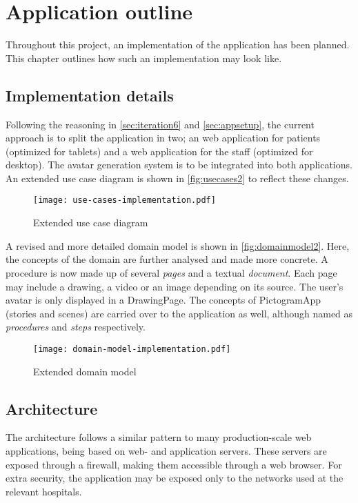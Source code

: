 \chapter{Application outline}
\label{ch:outline}

Throughout this project, an implementation of the application has been planned. This chapter outlines how such an implementation may look like.

\section{Implementation details}

Following the reasoning in \autoref{sec:iteration6} and \autoref{sec:appsetup}, the current approach is to split the application in two; an web application for patients (optimized for tablets) and a web application for the staff (optimized for desktop). The avatar generation system is to be integrated into both applications. An extended use case diagram is shown in \autoref{fig:usecases2} to reflect these changes.

\begin{figure}
    \centering
    \texttt{[image: use-cases-implementation.pdf]}
    \caption{Extended use case diagram}
    \label{fig:usecases2}
\end{figure}

A revised and more detailed domain model is shown in \autoref{fig:domainmodel2}. Here, the concepts of the domain are further analysed and made more concrete. A procedure is now made up of several \emph{pages} and a textual \emph{document}. Each page may include a drawing, a video or an image depending on its source. The user's avatar is only displayed in a DrawingPage. The concepts of PictogramApp (stories and scenes) are carried over to the application as well, although named as \emph{procedures} and \emph{steps} respectively.

\begin{figure}
    \centering
    \texttt{[image: domain-model-implementation.pdf]}
    \caption{Extended domain model}
    \label{fig:domainmodel2}
\end{figure}

\section{Architecture}

The architecture follows a similar pattern to many production-scale web applications, being based on web- and application servers. These servers are exposed through a firewall, making them accessible through a web browser. For extra security, the application may be exposed only to the networks used at the relevant hospitals.

